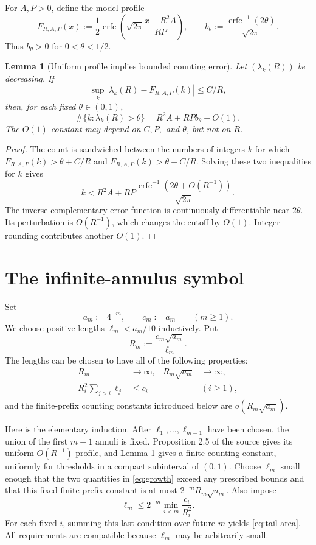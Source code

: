 \documentclass[11pt]{article}
\newtheorem{lemma}{Lemma}
\newcommand{\erfc}{\operatorname{erfc}}
\begin{document}
For $A,P>0$, define the model profile
\[
 F_{R,A,P}(x):=\frac12\erfc\!\left(
 \sqrt{2\pi}\frac{x-R^2A}{RP}\right),
 \qquad
 b_\theta:=\frac{\erfc^{-1}(2\theta)}{\sqrt{2\pi}}.
\]
Thus $b_\theta>0$ for $0<\theta<1/2$.

\begin{lemma}[Uniform profile implies bounded counting error]
\label{lem:counting}
Let $(\lambda_k(R))$ be decreasing.  If
\[
 \sup_k|\lambda_k(R)-F_{R,A,P}(k)|\leq C/R,
\]
then, for each fixed $\theta\in(0,1)$,
\begin{equation}\label{eq:counting-law}
 \#\{k:\lambda_k(R)>\theta\}
 =R^2A+RPb_\theta+O(1).
\end{equation}
The $O(1)$ constant may depend on $C,P,$ and $\theta$, but not on $R$.
\end{lemma}

\begin{proof}
The count is sandwiched between the numbers of integers $k$ for which
$F_{R,A,P}(k)>\theta+C/R$ and
$F_{R,A,P}(k)>\theta-C/R$.  Solving these two inequalities for $k$ gives
\[
 k<R^2A+RP\frac{\erfc^{-1}(2\theta+O(R^{-1}))}{\sqrt{2\pi}}.
\]
The inverse complementary error function is continuously differentiable near
$2\theta$.  Its perturbation is $O(R^{-1})$, which changes the cutoff by
$O(1)$.  Integer rounding contributes another $O(1)$.
\end{proof}

\section{The infinite-annulus symbol}

Set
\[
 a_m:=4^{-m},\qquad c_m:=a_m\qquad(m\geq1).
\]
We choose positive lengths $\ell_m<a_m/10$ inductively.  Put
\begin{equation}\label{eq:Rm}
 R_m:=\frac{c_m\sqrt{a_m}}{\ell_m}.
\end{equation}
The lengths can be chosen to have all of the following properties:
\begin{align}
 R_m&\longrightarrow\infty,
 &R_m\sqrt{a_m}&\longrightarrow\infty, \label{eq:growth}\\
 R_i^2\sum_{j>i}\ell_j&\leq c_i
 &&(i\geq1), \label{eq:tail-area}
\end{align}
and the finite-prefix counting constants introduced below are
$o(R_m\sqrt{a_m})$.

Here is the elementary induction.  After $\ell_1,\ldots,\ell_{m-1}$ have
been chosen, the union of the first $m-1$ annuli is fixed.  Proposition 2.5
of the source gives its uniform $O(R^{-1})$ profile, and Lemma
\ref{lem:counting} gives a finite counting constant, uniformly for thresholds
in a compact subinterval of $(0,1)$.  Choose $\ell_m$ small enough that the
two quantities in \eqref{eq:growth} exceed any prescribed bounds and that this
fixed finite-prefix constant is at most
$2^{-m}R_m\sqrt{a_m}$.  Also impose
\[
 \ell_m\leq2^{-m}\min_{i<m}\frac{c_i}{R_i^2}.
\]
For each fixed $i$, summing this last condition over future $m$ yields
\eqref{eq:tail-area}.  All requirements are compatible because $\ell_m$ may
be arbitrarily small.
\end{document}
